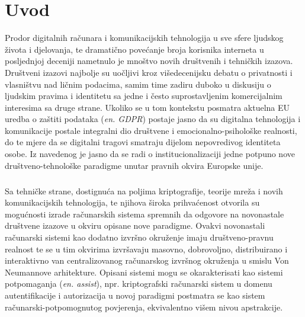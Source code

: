 \chapter{Uvod}
Prodor digitalnih računara i komunikacijskih tehnologija u sve sfere ljudskog života i djelovanja, te dramatično povećanje broja korisnika interneta u posljednjoj deceniji nametnulo je mnoštvo novih društvenih i tehničkih izazova. Društveni izazovi najbolje su uočljivi kroz višedecenijsku debatu o privatnosti i vlasništvu nad ličnim podacima, samim time zadiru duboko u diskusiju o ljudskim pravima i identitetu sa jedne i često suprostavljenim komercijalnim interesima sa druge strane. Ukoliko se u tom kontekstu posmatra aktuelna EU uredba o zaštiti podataka\cite{gdpr} (\textit{en. GDPR}) postaje jasno da su digitalna tehnologija i komunikacije postale integralni dio društvene i emocionalno-psihološke realnosti\cite{Searle1995}, do te mjere da se digitalni tragovi smatraju dijelom nepovredivog identiteta osobe. Iz navedenog je jasno da se radi o institucionalizaciji jedne potpuno nove društveno-tehnološke paradigme unutar pravnih okvira Europske unije.

\paragraph*{}
Sa tehničke strane, dostignuća na poljima kriptografije, teorije mreža i novih komunikacijskih tehnologija, te njihova široka prihvaćenost otvorila su mogućnosti izrade računarskih sistema spremnih da odgovore na novonastale društvene izazove u okviru opisane nove paradigme. Ovakvi novonastali računarski sistemi kao dodatno izvršno okruženje imaju društveno-pravnu realnost te se u tim okvirima izvršavaju masovno, dobrovoljno, distribuirano i interaktivno\cite{Cahill2003} van centralizovanog računarskog izvršnog okruženja u smislu Von Neumannove arhitekture. Opisani sistemi mogu se okarakterisati kao sistemi potpomaganja (\textit{en. assist}), npr. kriptografski računarski sistem u domenu autentifikacije i autorizacija u novoj paradigmi postmatra se kao sistem računarski-potpomognutog povjerenja, ekvivalentno višem nivou apstrakcije.

